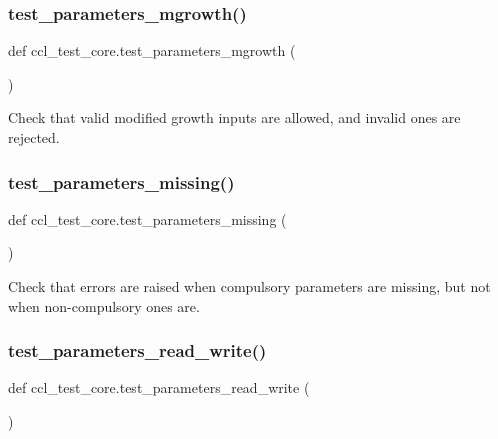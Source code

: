 \subsubsection{\texorpdfstring{test\+\_\+parameters\+\_\+mgrowth()}{test\_parameters\_mgrowth()}}
{\footnotesize\ttfamily def ccl\+\_\+test\+\_\+core.\+test\+\_\+parameters\+\_\+mgrowth (\begin{DoxyParamCaption}{ }\end{DoxyParamCaption})}

\begin{DoxyVerb}Check that valid modified growth inputs are allowed, and invalid ones are
rejected.
\end{DoxyVerb}
 \mbox{\label{namespaceccl__test__core_a0e549d6d40a6192560d27eeee5a52c6a}} 
\subsubsection{\texorpdfstring{test\+\_\+parameters\+\_\+missing()}{test\_parameters\_missing()}}
{\footnotesize\ttfamily def ccl\+\_\+test\+\_\+core.\+test\+\_\+parameters\+\_\+missing (\begin{DoxyParamCaption}{ }\end{DoxyParamCaption})}

\begin{DoxyVerb}Check that errors are raised when compulsory parameters are missing, but
not when non-compulsory ones are.
\end{DoxyVerb}
 \mbox{\label{namespaceccl__test__core_a924e671fa5314cb9250c4e9205105870}} 
\subsubsection{\texorpdfstring{test\+\_\+parameters\+\_\+read\+\_\+write()}{test\_parameters\_read\_write()}}
{\footnotesize\ttfamily def ccl\+\_\+test\+\_\+core.\+test\+\_\+parameters\+\_\+read\+\_\+write (\begin{DoxyParamCaption}{ }\end{DoxyParamCaption})}


